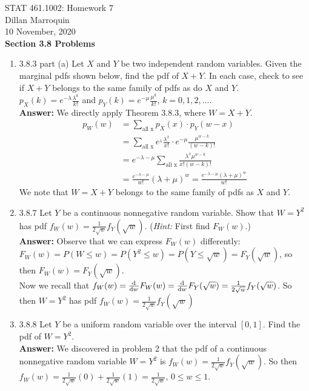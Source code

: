 \documentclass{article}
\begin{document}
    \noindent STAT 461.1002: Homework 7\\
    Dillan Marroquin\\
    10 November, 2020\\

    \noindent \textbf{Section 3.8 Problems}
    \begin{enumerate}
        \item 3.8.3 part (a) Let $X$ and $Y$ be two independent random variables. Given the marginal pdfs shown below, find the pdf of $X+Y$. In each case, check to see if $X+Y$ belongs to the same family of pdfs as do $X$ and $Y$.\\
        $p_X(k) = e^{-\lambda} \frac{\lambda^k}{k!}$ and $p_Y(k) = e^{-\mu}\frac{\mu^k}{k!}$, $k=0,1,2,\ldots$.\\
        \textbf{Answer: } We directly apply Theorem 3.8.3, where $W=X+Y$.
            \begin{align*}
                p_W(w) &= \sum_\text{all x} p_X(x) \cdot p_Y(w-x)\\
                &= \sum_\text{all x} e^{_\lambda}\frac{\lambda^x}{x!} \cdot e^{-\mu}\frac{\mu^{w-k}}{(w-k)!}\\
                &= e^{-\lambda-\mu} \sum_\text{all x} \frac{\lambda^x\mu^{w-k}}{x!(w-k)!}\\
                &= \frac{e^{-\lambda - \mu}}{w!} (\lambda+\mu)^w = \frac{e^{-\lambda-\mu} (\lambda+\mu)^w}{w!}
            \end{align*}
        We note that $W=X+Y$ belongs to the same family of pdfs as $X$ and $Y$.\\
        
        \item 3.8.7 Let $Y$ be a continuous nonnegative random variable. Show that $W=Y^2$ has pdf $f_W(w) = \frac{1}{2\sqrt{w}}f_Y(\sqrt{w})$. (\textit{Hint: }First find $F_W(w)$.)\\
        \textbf{Answer: }Observe that we can express $F_W(w)$ differently: $F_W(w) = P(W \leq w) = P(Y^2 \leq w) = P(Y \leq \sqrt{w}) = F_Y(\sqrt{w})$, so then $F_W(w) = F_Y(\sqrt{w})$.\\
        Now we recall that $f_W(w) = \od{}{w}F_W(w) = \od{}{w}F_Y(\sqrt{w}) = \frac{1}{2\sqrt{w}}f_Y(\sqrt{w})$. So then $W=Y^2$ has pdf $f_W(w) = \frac{1}{2\sqrt{w}}f_Y(\sqrt{w})~$
        
        \item 3.8.8 Let $Y$ be a uniform random variable over the interval $[0,1]$. Find the pdf of $W=Y^2$.\\
        \textbf{Answer: }We discovered in problem 2 that the pdf of a continuous nonnegative random variable $W=Y^2$ is $f_W(w)=\frac{1}{2\sqrt{w}}f_Y(\sqrt{w})$. So then $f_W(w) = \frac{1}{2\sqrt{w}}(0) + \frac{1}{2\sqrt{w}}(1) = \frac{1}{2\sqrt{w}}, \, 0 \leq w \leq 1$.\\
        

\end{enumerate}
\end{document}
